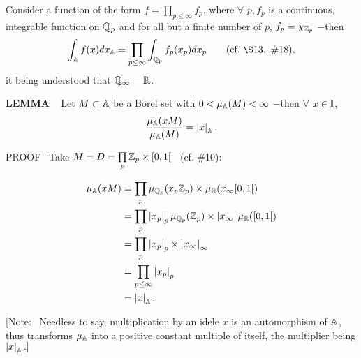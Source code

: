 Consider a function of the form $f = \prod\limits_{p \le \infty} f_p$, where $\forall$ $p, f_p$ is a continuous, 
integrable function on $\mathbb{Q}_p$ and for all but a finite number of $p$, 
$f_p = \chi_{\mathbb{Z}_p}$ 
$-$then
\[
\int_\A f(x)dx_\A = \prod_{p \le \infty}  \int_{\Q_p}	f_p(x_p) dx_p	\qquad (\text{cf.} \ \S13, \  \#18),
\]
it being understood that $\mathbb{Q}_\infty = \mathbb{R}$.

\vspace{0.1cm}




\begin{x}{\small\bf LEMMA} \ %
Let $M \subset \mathbb{A}$ be a Borel set with $0 < \mu_{\mathbb{A}} (M) < \infty$ $-$then $\forall$ $x \in \mathbb{I}$,
\[
\frac{\mu_{\mathbb{A}} (xM)}{\mu_{\mathbb{A}} (M)} = \left\vert x\right\vert_{\mathbb{A}}.
\]

\vspace{0.1cm}

PROOF \   Take $M = D = \prod\limits_p \mathbb{Z}_p \times [0,1[$ \  (cf. \#10):

\allowdisplaybreaks
\begin{align*}
\mu_{\mathbb{A}} (xM) 	
&= \prod\limits_p \mu_{\mathbb{Q}_p} (x_p\mathbb{Z}_p) \times \mu_{\mathbb{R}}(x_\infty [0,1[)\\	
&= \prod\limits_p \left\vert x_p\right\vert_p \mu_{\mathbb{Q}_p} (\mathbb{Z}_p) \times \left\vert x_\infty\right\vert \mu_{\mathbb{R}}([0,1[)\\	
&= \prod\limits_p \left\vert x_p\right\vert_p \times \left\vert x_\infty\right\vert_\infty\\
&= \prod_{p \le \infty} \left\vert x_p\right\vert_p \\
&= \left\vert x\right\vert_{\mathbb{A}}.
\end{align*}

[Note: \  Needless to say, multiplication by an idele $x$ is an automorphism of $\mathbb{A}$, thus transforms $\mu_{\mathbb{A}}$ into a positive constant multiple of itself, the multiplier being $\left\vert x\right\vert_{\mathbb{A}}.]$
\end{x}





















